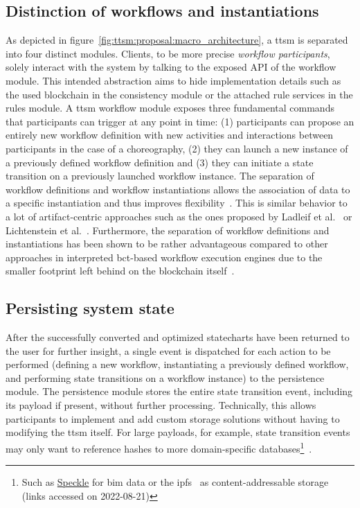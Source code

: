\subsection{Distinction of workflows and instantiations}
\label{sec:ttsm:proposal:distinction_workflows_instantiations}
As depicted in figure~\ref{fig:ttsm:proposal:macro_architecture}, a \gls{ttsm} is separated into four distinct modules. Clients, to be more precise \textit{workflow participants}, solely interact with the system by talking to the exposed API of the workflow module. This intended abstraction aims to hide implementation details such as the used blockchain in the consistency module or the attached rule services in the rules module. A \gls{ttsm} workflow module exposes three fundamental commands that participants can trigger at any point in time: (1) participants can propose an entirely new workflow definition with new activities and interactions between participants in the case of a choreography, (2) they can launch a new instance of a previously defined workflow definition and (3) they can initiate a state transition on a previously launched workflow instance. The separation of workflow definitions and workflow instantiations allows the association of data to a specific instantiation and thus improves flexibility~\cite{weske2012_bpm_architectures}. This is similar behavior to a lot of artifact-centric approaches such as the ones proposed by Ladleif et al.~\cite{modeling_blockchain_based_choreographies} or Lichtenstein et al.~\cite{data_driven_choreography_data_reusability_lichtenstein}. Furthermore, the separation of workflow definitions and instantiations has been shown to be rather advantageous compared to other approaches in interpreted \gls{bct}-based workflow execution engines due to the smaller footprint left behind on the blockchain itself~\cite{lean_architecture_for_blockchain_based_process_execution,interpreted_bp_on_blockchain_weber,interpreted_bp_on_blockchain_loukil}.


\subsection{Persisting system state}
\label{sec:ttsm:proposal:capturing_local_progress}
After the successfully converted and optimized statecharts have been returned to the user for further insight, a single event is dispatched for each action to be performed (defining a new workflow, instantiating a previously defined workflow, and performing state transitions on a workflow instance) to the persistence module. The persistence module stores the entire state transition event, including its payload if present, without further processing. Technically, this allows participants to implement and add custom storage solutions without having to modifying the \gls{ttsm} itself. For large payloads, for example, state transition events may only want to reference hashes to more domain-specific databases\footnote{Such as \href{https://speckle.systems/}{Speckle} for \gls{bim} data or the \gls{ipfs}~\cite{interplanetary_file_system} as content-addressable storage (links accessed on 2022-08-21)}~\cite{weber2019_architecture_for_dapps_blockchain_patterns,eberhardt17off_block}.

